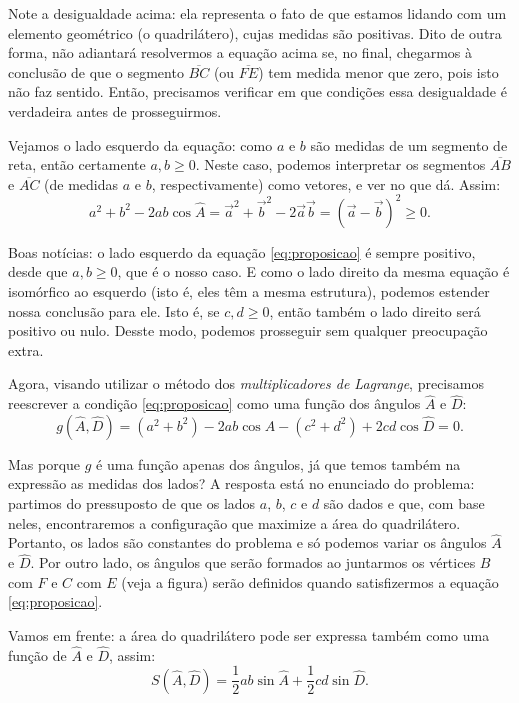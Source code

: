 \documentclass[a4paper,12pt]{scrartcl}
\begin{document}
  
  Note a desigualdade acima: ela representa o fato de que estamos lidando com um elemento geométrico (o quadrilátero), cujas medidas são positivas. Dito de outra forma, não adiantará resolvermos a equação acima se, no final, chegarmos à conclusão de que o segmento $\overline{BC}$ (ou $\overline{FE}$) tem medida menor que zero, pois isto não faz sentido. Então, precisamos verificar em que condições essa desigualdade é verdadeira antes de prosseguirmos.
  
  Vejamos o lado esquerdo da equação: como $a$ e $b$ são medidas de um segmento de reta, então certamente $a,b \ge 0$. Neste caso, podemos interpretar os segmentos $\overline{AB}$ e $\overline{AC}$ (de medidas $a$ e $b$, respectivamente) como vetores, e ver no que dá. Assim:
  \begin{equation*}
    a^2 + b^2 - 2ab\cos\hat A = \vec a^2 + \vec b^2 - 2\vec a\vec b = \left(\vec a - \vec b\right)^2 \ge 0.
  \end{equation*}

  Boas notícias: o lado esquerdo da equação \ref{eq:proposicao} é sempre positivo, desde que $a, b \ge 0$, que é o nosso caso. E como o lado direito da mesma equação é isomórfico ao esquerdo (isto é, eles têm a mesma estrutura), podemos estender nossa conclusão para ele. Isto é, se $c, d \ge 0$, então também o lado direito será positivo ou nulo. Desste modo, podemos prosseguir sem qualquer preocupação extra.
  
  Agora, visando utilizar o método dos \emph{multiplicadores de Lagrange}, precisamos reescrever a condição \ref{eq:proposicao} como uma função dos ângulos $\hat A$ e $\hat D$:
  \begin{equation}\label{eq:quadrilatero}
   g(\hat A, \hat D) = (a^2 + b^2) - 2ab\cos\hat A - (c^2 + d^2) + 2cd\cos\hat D = 0.
  \end{equation}
  
  Mas porque $g$ é uma função apenas dos ângulos, já que temos também na expressão as medidas dos lados? A resposta está no enunciado do problema: partimos do pressuposto de que os lados $a$, $b$, $c$ e $d$ são dados e que, com base neles, encontraremos a configuração que maximize a área do quadrilátero. Portanto, os lados são constantes do problema e só podemos variar os ângulos $\hat A$ e $\hat D$. Por outro lado, os ângulos que serão formados ao juntarmos os vértices $B$ com $F$ e $C$ com $E$ (veja a figura) serão definidos quando satisfizermos a equação \ref{eq:proposicao}.
  
  Vamos em frente: a área do quadrilátero pode ser expressa também como uma função de $\hat A$ e $\hat D$, assim:
  \begin{equation}\label{eq:area}
    S(\hat A, \hat D) = \frac{1}{2} ab\sin\hat A + \frac{1}{2}cd\sin \hat D.
  \end{equation}
  
\end{document}
